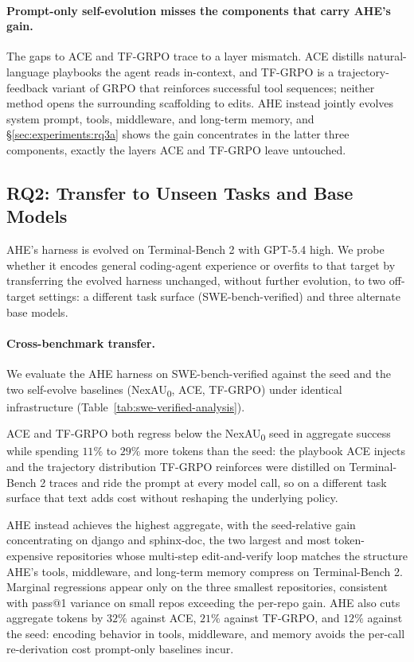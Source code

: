 \paragraph{Prompt-only self-evolution misses the components that carry AHE's gain.}
The gaps to ACE and TF-GRPO trace to a layer mismatch. ACE distills natural-language playbooks the agent reads in-context, and TF-GRPO is a trajectory-feedback variant of GRPO that reinforces successful tool sequences; neither method opens the surrounding scaffolding to edits.
AHE instead jointly evolves system prompt, tools, middleware, and long-term memory, and \S\ref{sec:experiments:rq3a} shows the gain concentrates in the latter three components, exactly the layers ACE and TF-GRPO leave untouched.

\subsection{RQ2: Transfer to Unseen Tasks and Base Models}
\label{sec:experiments:transfer}

AHE's harness is evolved on Terminal-Bench 2 with GPT-5.4 high. We probe whether it encodes general coding-agent experience or overfits to that target by transferring the evolved harness unchanged, without further evolution, to two off-target settings: a different task surface (SWE-bench-verified) and three alternate base models.



\paragraph{Cross-benchmark transfer.}
We evaluate the AHE harness on SWE-bench-verified against the seed and the two self-evolve baselines (NexAU\textsubscript{0}, ACE, TF-GRPO) under identical infrastructure (Table~\ref{tab:swe-verified-analysis}).

ACE and TF-GRPO both regress below the NexAU\textsubscript{0} seed in aggregate success while spending $11\%$ to $29\%$ more tokens than the seed: the playbook ACE injects and the trajectory distribution TF-GRPO reinforces were distilled on Terminal-Bench 2 traces and ride the prompt at every model call, so on a different task surface that text adds cost without reshaping the underlying policy.

AHE instead achieves the highest aggregate, with the seed-relative gain concentrating on django and sphinx-doc, the two largest and most token-expensive repositories whose multi-step edit-and-verify loop matches the structure AHE's tools, middleware, and long-term memory compress on Terminal-Bench 2.
Marginal regressions appear only on the three smallest repositories, consistent with pass@1 variance on small repos exceeding the per-repo gain.
AHE also cuts aggregate tokens by $32\%$ against ACE, $21\%$ against TF-GRPO, and $12\%$ against the seed: encoding behavior in tools, middleware, and memory avoids the per-call re-derivation cost prompt-only baselines incur.

